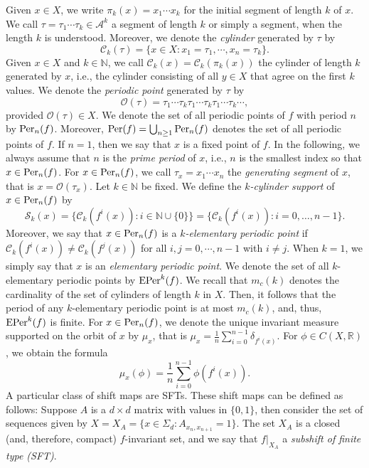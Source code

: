 \documentclass[11pt, reqno]{amsart}
\newcommand{\Per}{{\rm Per}}
\newcommand{\EPer}{{\rm EPer}}
\newcommand{\Or}{\mathcal{O}}
\newcommand{\bR}{{\mathbb R}}
\newcommand{\bN}{{\mathbb N}}
\newcommand{\cA}{{\mathcal A}}
\newcommand{\cC}{{\mathcal C}}
\newcommand{\cS}{{\mathcal S}}
\def\Per{{\rm Per}}
\def\Per{{\rm Per}}
\def\EPer{{\rm EPer}}
\begin{document}
Given $x\in X$, we write $\pi_k(x)=x_1\cdots x_k$ for the initial segment of length $k$ of $x$. We call $\tau=\tau_1\cdots\tau_k\in \cA^k$ a segment of length $k$ or simply a segment, when the length $k$ is understood. Moreover, we denote  the \emph{cylinder} generated by $\tau$ by $$\cC_k(\tau)=\{x\in X: x_1=\tau_1,\cdots, x_n=\tau_k\}.$$  Given $x\in X$ and $k\in \bN$, we call $\cC_k(x)=\cC_k(\pi_k(x))$ the cylinder of length $k$ generated by $x$, i.e., the cylinder consisting of all $y\in X$ that agree on the first $k$ values.   We denote the \emph{periodic point} generated by $\tau$ by $$\Or(\tau)=\tau_1 \cdots \tau_k \tau_1 \cdots \tau_k\tau_1 \cdots \tau_k\cdots,$$ provided $\Or(\tau)\in X$.  
We denote the set of all periodic points of $f$ with period $n$ by $\Per_n(f)$. Moreover, $\Per(f)=\bigcup_{n\geq1} \Per_n(f)$ denotes the set of all periodic points of $f$. If $n=1$, then we say that $x$ is a fixed point of $f$. In the following, we always assume that $n$ is the {\em prime period} of $x$, i.e., $n$ is the smallest index so that $x\in\Per_n(f)$.
For $x\in \Per_n(f)$, we call $\tau_x=x_1\cdots x_{n}$ the {\em generating segment} of  $x$, that is $x=\Or(\tau_x)$.
Let $k\in \bN$ be fixed. We define the {\em $k$-cylinder support} of $x\in \Per_n(f)$ by 
\begin{equation}\label{defkcyl}
\cS_k(x)=\{\cC_k(f^i(x)): i\in \bN\cup\{0\}\}=\{\cC_k(f^i(x)): i= 0,\dots,n-1\}.
\end{equation}
Moreover, we say that $x\in \Per_n(f)$  is a {\em $k$-elementary periodic point}  if $\cC_k(f^i(x))\not=\cC_k(f^j(x))$ for all $i,j=0,\cdots,n-1$ with $i\not=j$. When $k=1$, we simply say that $x$ is an {\em elementary periodic point}.  We denote the set of all $k$-elementary periodic points by $\EPer^k(f)$.  We recall that $m_c(k)$ denotes the cardinality of the set of cylinders of length $k$ in $X$.  Then, it follows that the period of any $k$-elementary periodic point is at most $m_c(k)$, and, thus, $\EPer^k(f)$ is finite. 
For $x\in \Per_n(f)$, we denote the unique invariant measure supported on the orbit of $x$ by $\mu_x$, that is $\mu_x=\frac{1}{n}\sum_{i=0}^{n-1} \delta_{f^i(x)}$. For $\phi\in C(X,\bR)$, we obtain the formula
\begin{equation}\label{muxphi}
\mu_x(\phi)=\frac{1}{n}\sum_{i=0}^{n-1} \phi(f^i(x)).
\end{equation}
A particular class of shift maps are SFTs.
These shift maps can be defined as follows: Suppose $A$ is a $d\times d$ matrix with values in $\{0,1\}$, then consider the set of sequences given by  
$X=X_A=\{x\in \Sigma_d: A_{x_n,x_{n+1}}=1\}.$  The set $X_A$ is a closed (and, therefore, compact) $f$-invariant set, and we say that $f|_{X_A}$ a {\em subshift of finite type (SFT)}.
\end{document}
